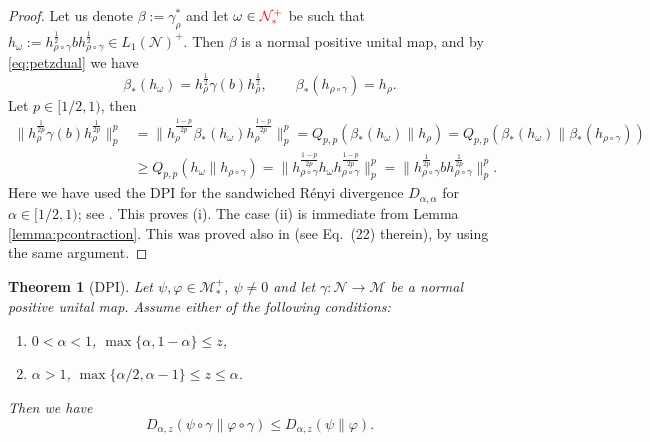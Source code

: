 \documentclass[12pt]{article}
\newtheorem{theorem}{Theorem}[section]
\theoremstyle{definition}
\theoremstyle{remark}
\numberwithin{equation}{section}
\def\Me{\mathcal M}
\def\Ne{\mathcal N}
\begin{document}
\begin{proof} Let us denote $\beta:=\gamma_\rho^*$ and let $\omega\in {\color{red}\Ne_*^+}$ be such
that 
$h_\omega:=h_{\rho\circ\gamma}^{\frac12}bh_{\rho\circ\gamma}^{\frac12}\in L_1(\Ne)^+$. Then
$\beta$ is a normal positive unital map, and {\color{red}by \eqref{eq:petzdual}} we have
\[
\beta_*(h_\omega)=h_\rho^{\frac12}\gamma(b)h_\rho^{\frac12},\qquad
\beta_*(h_{\rho\circ\gamma})=h_\rho.
\]
Let $p\in [1/2,1)$, then  
\begin{align*}
\Big\|h_{\rho}^{\frac{1}{2p}}\gamma(b)h_{\rho}^{\frac{1}{2p}}\Big\|^p_p
&=\Big\|h_\rho^{\frac{1-p}{2p}}\beta_*(h_\omega)h_\rho^{\frac{1-p}{2p}}\Big\|_p^p
=Q_{p,p}(\beta_*(h_\omega)\|h_\rho)=Q_{p,p}(\beta_*(h_\omega)\|\beta_*(h_{\rho\circ\gamma}))\\
&\ge  Q_{p,p}(h_\omega\|h_{\rho\circ\gamma})=\Big\|h_{\rho\circ\gamma}^{\frac{1-p}{2p}}h_\omega
h_{\rho\circ\gamma}^{\frac{1-p}{2p}}\Big\|_p^p
=\Big\|h_{\rho\circ\gamma}^{\frac{1}{2p}}bh_{\rho\circ\gamma}^{\frac{1}{2p}}\Big\|^p_p.
\end{align*}
Here we have used the DPI for the sandwiched R\'enyi  divergence $D_{\alpha,\alpha}$ for
$\alpha\in [1/2,1)$; see \cite[Theorem 4.1]{jencova2021renyi}. This proves (i).
The case (ii) is immediate from Lemma \ref{lemma:pcontraction}. This was proved also 
in \cite{kato2023onrenyi} (see Eq.~(22) therein), by using the same argument.
\end{proof}

\begin{theorem}[DPI] \label{thm:dpi}
Let $\psi,\varphi\in \Me_*^+$, $\psi\ne 0$ and let $\gamma:\Ne\to \Me$ be a normal positive
unital map. Assume either of the following conditions:
\begin{enumerate}
\item[(i)] $0<\alpha<1$, $\max\{\alpha,1-\alpha\}\le z$,
\item[(ii)] $\alpha>1$, $\max\{\alpha/2,\alpha-1\}\le z\le \alpha$.
\end{enumerate}
Then we have
\[
D_{\alpha,z}(\psi\circ\gamma\|\varphi\circ\gamma)\le D_{\alpha,z}(\psi\|\varphi).
\]
\end{theorem}
\end{document}
